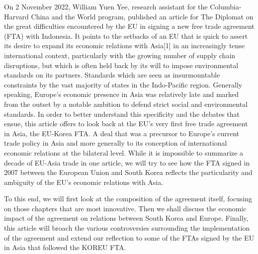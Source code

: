 \documentclass[11pt,a4paper]{article}
\begin{document}
\thispagestyle{empty}
\par\medskip
{}
\smallskip{}
\medskip
\noindent{\color{accent}\rule{\linewidth}{0.8pt}}\par\smallskip
{}\par
\smallskip{}\par\bigskip

On 2 November 2022, William Yuen Yee, research assistant for the Columbia-Harvard China and the World program, published an article for The Diplomat on the great difficulties encountered by the EU in signing a new free trade agreement (FTA) with Indonesia. It points to the setbacks of an EU that is quick to assert its desire to expand its economic relations with Asia{[}1{]} in an increasingly tense international context, particularly with the growing number of supply chain disruptions, but which is often held back by its will to impose environmental standards on its partners. Standards which are seen as insurmountable constraints by the vast majority of states in the Indo-Pacific region. Generally speaking, Europe’s economic presence in Asia was relatively late and marked from the outset by a notable ambition to defend strict social and environmental standards. In order to better understand this specificity and the debates that ensue, this article offers to look back at the EU’s very first free trade agreement in Asia, the EU-Korea FTA. A deal that was a precursor to Europe’s current trade policy in Asia and more generally to its conception of international economic relations at the bilateral level. While it is impossible to summarize a decade of EU-Asia trade in one article, we will try to see how the FTA signed in 2007 between the European Union and South Korea reflects the particularity and ambiguity of the EU’s economic relations with Asia.

To this end, we will first look at the composition of the agreement itself, focusing on those chapters that are most innovative. Then we shall discuss the economic impact of the agreement on relations between South Korea and Europe. Finally, this article will broach the various controversies surrounding the implementation of the agreement and extend our reflection to some of the FTAs signed by the EU in Asia that followed the KOREU FTA.
\end{document}
